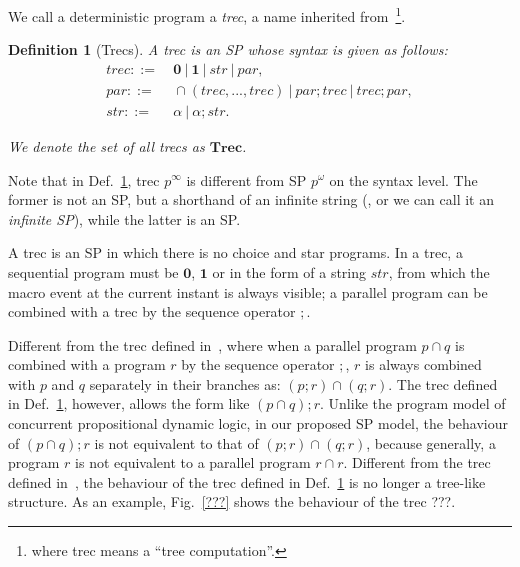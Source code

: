 \documentclass{fcs}
\newtheorem{mydef}{Definition}[section]
\newcommand{\bff}[1]{\mathbf{#1}}
\newcommand{\noth}[0]{\mathbf{1}}
\newcommand{\halt}[0]{\mathbf{0}}
\DeclareMathOperator{\seq}{;}
\DeclareMathOperator{\para}{\cap}
\newcommand{\Trec}[0]{\bff{Trec}}
\newcommand{\irep}[0]{\infty}
\newcommand{\strr}[0]{\mathit{str}}
\newcommand{\trec}[0]{\mathit{trec}}
\newcommand{\word}[0]{\mathit{wrd}}
\newcommand{\parp}[0]{\mathit{par}}
\newcommand{\ddef}[0]{::=}
\begin{document}
We call a deterministic program a \emph{trec}, a name inherited from~\cite{Peleg87}\footnote{where trec means a ``tree computation''.}.


\begin{mydef}[Trecs]
	\label{def:Trecs}
	A trec is an SP whose syntax is given as follows:
    $$
    \begin{aligned}
    \trec\ddef&\ \halt\ |\ \noth\ |\ \strr\ |\ \parp, \\
    \parp\ddef&\ \para(\trec,...,\trec)\ |\ \parp\seq \trec\ |\ \trec\seq \parp,\\
    \strr\ddef&\ \alpha\ |\ \alpha\seq \strr.
    \end{aligned}
    $$
	
    We denote the set of all trecs as $\Trec$.
	
\end{mydef}

\ifx
Note that in Def.~\ref{def:Trecs}, trec $p^\irep$ is different from SP $p^\omega$ on the syntax level.
The former is not an SP, but a shorthand of an infinite string (, or we can call it an \emph{infinite SP}), while the latter is an SP.
\fi

A trec is an SP in which there is no choice and star programs. In a trec, a sequential program must be $\halt$, $\noth$ or in the form of a string $\strr$,
from which the macro event at the current instant is always visible; a parallel program can be combined with a trec by the sequence operator $\seq$.

Different from the trec defined in~\cite{Peleg87}, where when a parallel program $p\para q$ is combined with a program $r$ by the sequence operator $\seq$,
$r$ is always combined with $p$ and $q$ separately in their branches as: $(p\seq r) \para (q\seq r)$.
The trec defined in Def.~\ref{def:Trecs}, however, allows the form like $(p\para q)\seq r$.
Unlike the program model of concurrent propositional dynamic logic, in our proposed SP model, the behaviour of $(p\para q)\seq r$ is not equivalent to that of $(p\seq r)\para(q\seq r)$, because generally, a program $r$ is not equivalent to
a parallel program $r\para r$.
\ifx
Different from the trec defined in~\cite{Peleg87}, the behaviour of the trec defined in Def.~\ref{def:Trecs} is no longer a tree-like structure.
As an example, Fig.~\ref{???} shows the behaviour of the trec ???.
\end{document}
